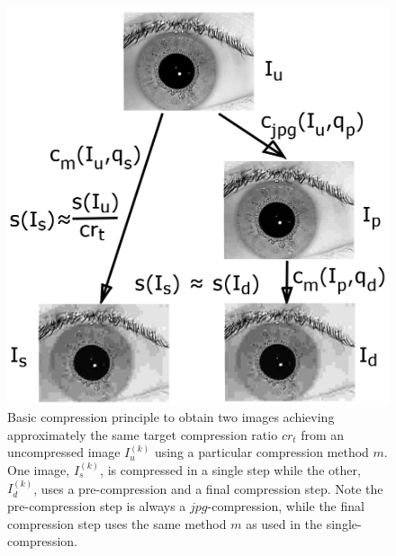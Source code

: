 \documentclass[10pt,twocolumn,letterpaper]{article}
\begin{document}
\begin{figure}[h]
	\begin{center}
		
	\includegraphics[width=0.7\linewidth]{img/comprScheme}
\end{center}
	\caption{Basic compression principle to obtain two images achieving approximately the same target compression ratio $cr_t$ from an uncompressed image $I_u^{(k)}$ using a particular compression method $m$. One image, $I_s^{(k)}$, is compressed in a single step while the other, $I_d^{(k)}$, uses a pre-compression and a final compression step. Note the pre-compression step is always a $jpg$-compression, while the final compression step uses the same method $m$ as used in the single-compression.}
	\label{fig:comprScheme}
	
\end{figure}
\end{document}

